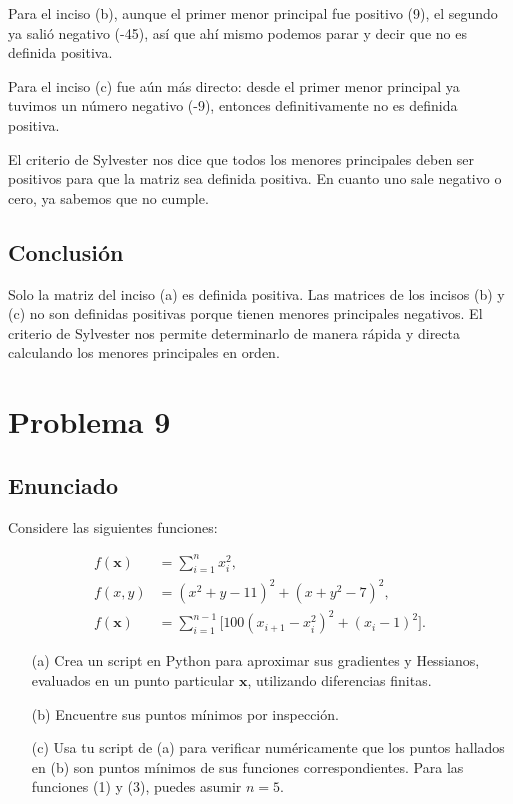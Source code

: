 \documentclass{article}
\begin{document}
Para el inciso (b), aunque el primer menor principal fue positivo (9), el segundo ya salió negativo (-45), así que ahí mismo podemos parar y decir que no es definida positiva.

Para el inciso (c) fue aún más directo: desde el primer menor principal ya tuvimos un número negativo (-9), entonces definitivamente no es definida positiva.

El criterio de Sylvester nos dice que todos los menores principales deben ser positivos para que la matriz sea definida positiva. En cuanto uno sale negativo o cero, ya sabemos que no cumple.

\subsection{Conclusión}

Solo la matriz del inciso (a) es definida positiva. Las matrices de los incisos (b) y (c) no son definidas positivas porque tienen menores principales negativos. El criterio de Sylvester nos permite determinarlo de manera rápida y directa calculando los menores principales en orden.

\section{Problema 9}

\subsection{Enunciado}
\setcounter{equation}{0}
Considere las siguientes funciones:

\begin{align}
f(\mathbf{x}) &= \sum_{i=1}^{n} x_i^{2}, \label{eq:1}\\
f(x,y) &= (x^{2}+y-11)^{2} + (x+y^{2}-7)^{2}, \label{eq:2}\\
f(\mathbf{x}) &= \sum_{i=1}^{n-1} \bigl[100(x_{i+1}-x_i^{2})^{2} + (x_i-1)^{2}\bigr]. \label{eq:3}
\end{align}

\begin{enumerate}
  \item[(a)] Crea un script en Python para aproximar sus gradientes y Hessianos, evaluados en un punto particular $\mathbf{x}$, utilizando diferencias finitas.
  \item[(b)] Encuentre sus puntos mínimos por inspección.
  \item[(c)] Usa tu script de (a) para verificar numéricamente que los puntos hallados en (b) son puntos mínimos de sus funciones correspondientes. Para las funciones (1) y (3), puedes asumir $n=5$.
\end{enumerate}
\end{document}
